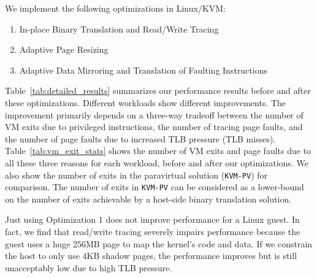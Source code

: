 \documentclass[10pt,twocolumn]{article}
\begin{document}
We implement the following optimizations in Linux/KVM:
\begin{enumerate}
  \item In-place Binary Translation and Read/Write Tracing
  \item Adaptive Page Resizing
  \item Adaptive Data Mirroring and Translation of Faulting Instructions
\end{enumerate}
Table~\ref{tab:detailed_results} summarizes our performance results before and
after these optimizations.
Different workloads show different improvements. The improvement primarily depends
on a three-way tradeoff between the number of VM exits due to privileged
instructions, the number of
tracing page faults, and the number of page faults due to increased TLB pressure (TLB misses).
Table~\ref{tab:vm_exit_stats} shows the number of VM exits and page faults due
to all these three reasons for each workload, before and after our optimizations.
We also show the number of exits in the paravirtual solution ({\tt KVM-PV}) for
comparison. The number of exits in {\tt KVM-PV} can be considered as a
lower-bound on the number of exits
achievable by a host-side binary translation solution.

Just using Optimization 1 does not improve performance for a Linux guest.
In fact, we find that read/write tracing severely impairs performance because
the guest uses a huge 256MB page to map the kernel's code and data. If we
constrain the host to only use 4KB shadow pages, the performance improves
but is still unacceptably low due to high TLB pressure.
\end{document}
